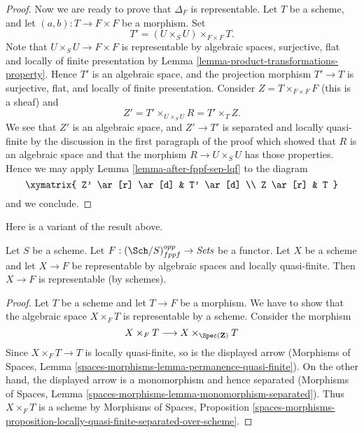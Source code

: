 \begin{proof}
\medskip\noindent
Now we are ready to prove that $\Delta_F$ is representable.
Let $T$ be a scheme, and let $(a, b) : T \to F \times F$ be a morphism.
Set
$$
T' = (U \times_S U) \times_{F \times F} T.
$$
Note that $U \times_S U \to F \times F$ is
representable by algebraic spaces, surjective, flat and
locally of finite presentation by
Lemma \ref{lemma-product-transformations-property}.
Hence $T'$ is an algebraic space, and the projection morphism
$T' \to T$ is surjective, flat, and locally of finite presentation.
Consider $Z = T \times_{F \times F} F$ (this is a sheaf) and
$$
Z' = T' \times_{U \times_S U} R
= T' \times_T Z.
$$
We see that $Z'$ is an algebraic space, and
$Z' \to T'$ is separated and locally quasi-finite by the
discussion in the first paragraph of the proof which showed that $R$ is
an algebraic space and that the
morphism $R \to U \times_S U$ has those properties.
Hence we may apply
Lemma \ref{lemma-after-fppf-sep-lqf}
to the diagram
$$
\xymatrix{
Z' \ar[r] \ar[d] & T' \ar[d] \\
Z \ar[r] & T
}
$$
and we conclude.
\end{proof}

\noindent
Here is a variant of the result above.

\begin{lemma}
\label{lemma-bootstrap-locally-quasi-finite}
Let $S$ be a scheme. Let $F : (\Sch/S)_{fppf}^{opp} \to \textit{Sets}$ be a
functor. Let $X$ be a scheme and let $X \to F$ be representable by algebraic
spaces and locally quasi-finite. Then $X \to F$ is representable
(by schemes).
\end{lemma}

\begin{proof}
Let $T$ be a scheme and let $T \to F$ be a morphism. We have to show that
the algebraic space $X \times_F T$ is representable by a scheme. Consider
the morphism
$$
X \times_F T  \longrightarrow X \times_{\Spec(\mathbf{Z})} T
$$
Since $X \times_F T \to T$ is locally quasi-finite, so is the displayed
arrow (Morphisms of Spaces, Lemma
\ref{spaces-morphisms-lemma-permanence-quasi-finite}).
On the other hand, the displayed arrow is a monomorphism
and hence separated (Morphisms of Spaces, Lemma
\ref{spaces-morphisms-lemma-monomorphism-separated}).
Thus $X \times_F T$ is a scheme by Morphisms of Spaces, Proposition
\ref{spaces-morphisms-proposition-locally-quasi-finite-separated-over-scheme}.
\end{proof}











